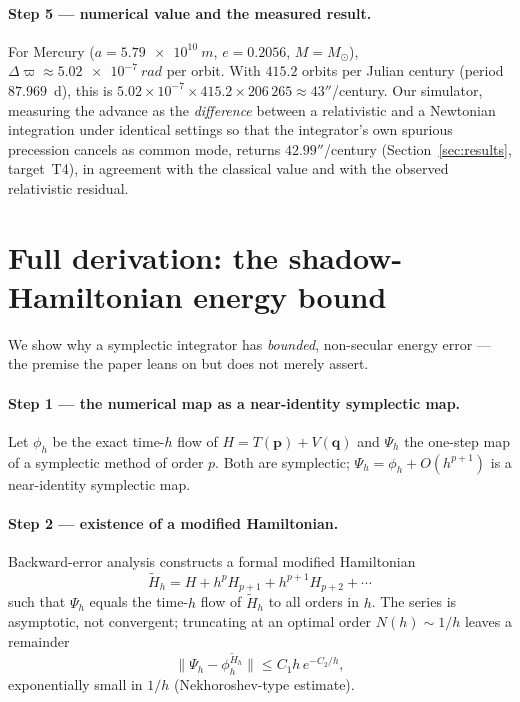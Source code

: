 \documentclass[11pt]{article}
\theoremstyle{definition}
\begin{document}
\paragraph{Step 5 --- numerical value and the measured result.}
For Mercury ($a = \SI{5.79e10}{m}$, $e = 0.2056$, $M = M_\odot$),
$\Delta\varpi \approx \SI{5.02e-7}{rad}$ per orbit. With
$415.2$ orbits per Julian century (period $87.969$~d), this is
$5.02\times10^{-7}\times 415.2 \times 206\,265 \approx 43''$/century. Our
simulator, measuring the advance as the \emph{difference} between a relativistic
and a Newtonian integration under identical settings so that the integrator's
own spurious precession cancels as common mode, returns
$42.99''$/century (Section~\ref{sec:results}, target~T4), in agreement with the
classical value and with the observed relativistic residual.

\section{Full derivation: the shadow-Hamiltonian energy bound}
\label{app:shadow}

We show why a symplectic integrator has \emph{bounded}, non-secular energy
error --- the premise the paper leans on but does not merely assert.

\paragraph{Step 1 --- the numerical map as a near-identity symplectic map.}
Let $\phi_h$ be the exact time-$h$ flow of $H = T(\mathbf p) + V(\mathbf q)$ and
$\Psi_h$ the one-step map of a symplectic method of order $p$. Both are
symplectic; $\Psi_h = \phi_h + O(h^{p+1})$ is a near-identity symplectic map.

\paragraph{Step 2 --- existence of a modified Hamiltonian.}
Backward-error analysis \cite{benettingiorgilli1994, hairerlubichwanner2006}
constructs a formal modified Hamiltonian
\begin{equation}
\tilde H_h = H + h^{p}H_{p+1} + h^{p+1}H_{p+2} + \cdots
\label{eq:modham}
\end{equation}
such that $\Psi_h$ equals the time-$h$ flow of $\tilde H_h$ to all orders in
$h$. The series is asymptotic, not convergent; truncating at an optimal order
$N(h)\sim 1/h$ leaves a remainder
\begin{equation}
\|\Psi_h - \phi^{\tilde H_h}_{h}\| \le C_1 h\,e^{-C_2/h},
\end{equation}
exponentially small in $1/h$ (Nekhoroshev-type estimate).
\end{document}
